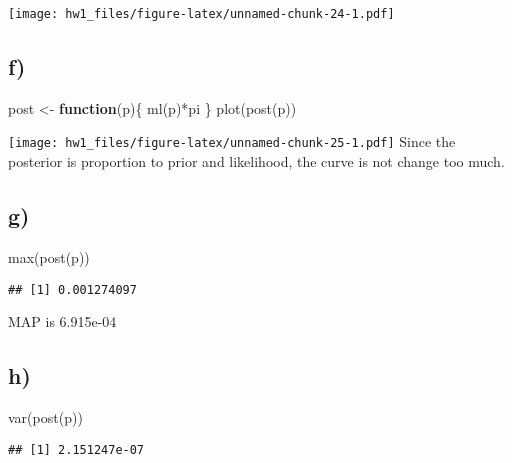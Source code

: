 \documentclass[
]{article}
\newenvironment{Shaded}{\begin{snugshade}}{\end{snugshade}}
\newcommand{\ControlFlowTok}[1]{\textcolor[rgb]{0.13,0.29,0.53}{\textbf{#1}}}
\newcommand{\FunctionTok}[1]{\textcolor[rgb]{0.00,0.00,0.00}{#1}}
\newcommand{\NormalTok}[1]{#1}
\newcommand{\OtherTok}[1]{\textcolor[rgb]{0.56,0.35,0.01}{#1}}
\newcommand{\SpecialCharTok}[1]{\textcolor[rgb]{0.00,0.00,0.00}{#1}}
\begin{document}
\texttt{[image: hw1\_files/figure-latex/unnamed-chunk-24-1.pdf]}

\hypertarget{f-2}{%
\subsection{f)}\label{f-2}}

\begin{Shaded}
\begin{Highlighting}[]
\NormalTok{post }\OtherTok{\textless{}{-}} \ControlFlowTok{function}\NormalTok{(p)\{}
  \FunctionTok{ml}\NormalTok{(p)}\SpecialCharTok{*}\NormalTok{pi}
\NormalTok{\}}
\FunctionTok{plot}\NormalTok{(}\FunctionTok{post}\NormalTok{(p))}
\end{Highlighting}
\end{Shaded}

\texttt{[image: hw1\_files/figure-latex/unnamed-chunk-25-1.pdf]} Since
the posterior is proportion to prior and likelihood, the curve is not
change too much.

\hypertarget{g-2}{%
\subsection{g)}\label{g-2}}

\begin{Shaded}
\begin{Highlighting}[]
\FunctionTok{max}\NormalTok{(}\FunctionTok{post}\NormalTok{(p))}
\end{Highlighting}
\end{Shaded}

\begin{verbatim}
## [1] 0.001274097
\end{verbatim}

MAP is 6.915e-04

\hypertarget{h-2}{%
\subsection{h)}\label{h-2}}

\begin{Shaded}
\begin{Highlighting}[]
\FunctionTok{var}\NormalTok{(}\FunctionTok{post}\NormalTok{(p))}
\end{Highlighting}
\end{Shaded}

\begin{verbatim}
## [1] 2.151247e-07
\end{verbatim}
\end{document}
